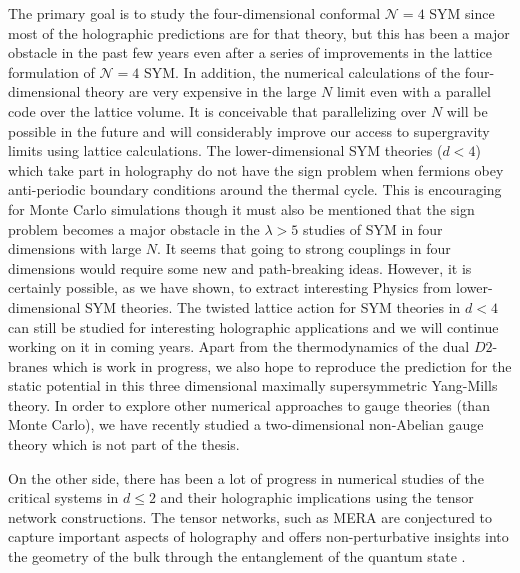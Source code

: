 The primary goal is to study the four-dimensional conformal $\mathcal{N}=4$ SYM 
since most of the holographic predictions are for that theory, but this has been a major obstacle
in the past few years even after a series of improvements in the lattice formulation of $\mathcal{N}=4$ SYM. 
In addition, the numerical calculations of the four-dimensional theory are very expensive in the 
large $N$ limit even with a parallel code over the lattice volume. It is conceivable that
parallelizing over $N$ will be possible in the future and will considerably improve our access to 
supergravity limits using lattice calculations. 
The lower-dimensional SYM theories ($d < 4$) which take part in holography do not 
have the sign problem when fermions obey anti-periodic boundary conditions around the thermal
cycle. This is encouraging for Monte Carlo simulations though it must also be mentioned that the sign problem 
becomes a major obstacle in the $\lambda > 5$ studies of SYM in four dimensions with large $N$. 
It seems that going to strong couplings in four dimensions would require some new and path-breaking ideas. 
However, it is certainly possible, as we have shown, to extract interesting Physics from 
lower-dimensional SYM theories. The twisted lattice action for SYM theories in $d <4$ can still 
be studied for interesting holographic applications and 
we will continue working on it in coming years. Apart from the thermodynamics of the dual 
$D2$-branes which is work in progress, we also hope to reproduce the prediction for the static 
potential in this three dimensional maximally supersymmetric Yang-Mills theory. In order to 
explore other numerical approaches to gauge theories (than Monte Carlo), 
we have recently studied a two-dimensional non-Abelian gauge theory \cite{Bazavov:2019qih}
which is not part of the thesis.  

On the other side, there has been a lot of progress in numerical studies of
the critical systems in $d \le 2$ and their holographic implications using the 
tensor network constructions. The tensor networks, such as MERA \cite{2008PhRvL.101k0501V} 
are conjectured to capture important aspects of holography and offers non-perturbative 
insights into the geometry of the bulk through the entanglement of the quantum state 
\cite{Swingle:2009bg, 2015PhRvL.115t0401E, 2011JSP...145..891E, 
2018RvMP...90c5007N, VanRaamsdonk:2009ar, Headrick:2018ctr}.

